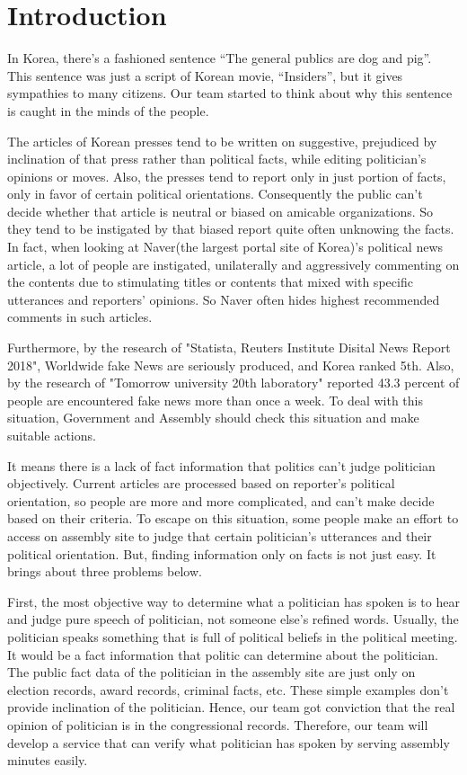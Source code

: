 \documentclass[conference]{IEEEtran}
\begin{document}
\vspace{5mm}
 
\section{Introduction}
In Korea, there’s a fashioned sentence “The general publics are dog and pig”. This sentence was just a script of Korean movie, “Insiders”, but it gives sympathies to many citizens. Our team started to think about why this sentence is caught in the minds of the people.
 
The articles of Korean presses tend to be written on suggestive, prejudiced by inclination of that press rather than political facts, while editing politician’s opinions or moves. Also, the presses tend to report only in just portion of facts, only in favor of certain political orientations. Consequently the public can’t decide whether that article is neutral or biased on amicable organizations. So they tend to be instigated by that biased report quite often unknowing the facts. In fact, when looking at Naver(the largest portal site of Korea)’s political news article, a lot of people are instigated, unilaterally and aggressively commenting on the contents due to stimulating titles or contents that mixed with specific utterances and reporters' opinions. So Naver often hides highest recommended comments in such articles.

Furthermore, by the research of "Statista, Reuters Institute Disital News Report 2018", Worldwide fake News are seriously produced, and Korea ranked 5th. Also, by the research of "Tomorrow university 20th laboratory" reported 43.3 percent of people are encountered fake news more than once a week. To deal with this situation, Government and Assembly should check this situation and make suitable actions.
 
It means there is a lack of fact information that politics can’t judge politician objectively. Current articles are processed based on reporter’s political orientation, so people are more and more complicated, and can’t make decide based on their criteria. To escape on this situation, some people make an effort to access on assembly site to judge that certain politician’s utterances and their political orientation. But, finding information only on facts is not just easy. It brings about three problems below.
 
First, the most objective way to determine what a politician has spoken is to hear and judge pure speech of politician, not someone else’s refined words. Usually, the politician speaks something that is full of political beliefs in the political meeting. It would be a fact information that politic can determine about the politician. The public fact data of the politician in the assembly site are just only on election records, award records, criminal facts, etc. These simple examples don’t provide inclination of the politician. Hence, our team got conviction that the real opinion of politician is in the congressional records. Therefore, our team will develop a service that can verify what politician has spoken by serving  assembly minutes easily.
 
\end{document}

